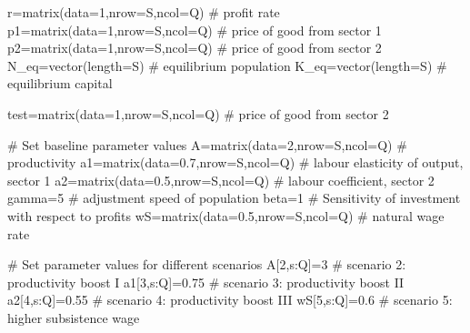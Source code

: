 \documentclass[
  letterpaper,
  DIV=11,
  numbers=noendperiod]{scrreprt}
\newenvironment{Shaded}{\begin{snugshade}}{\end{snugshade}}
\newcommand{\AttributeTok}[1]{\textcolor[rgb]{0.40,0.45,0.13}{#1}}
\newcommand{\CommentTok}[1]{\textcolor[rgb]{0.37,0.37,0.37}{#1}}
\newcommand{\DecValTok}[1]{\textcolor[rgb]{0.68,0.00,0.00}{#1}}
\newcommand{\FloatTok}[1]{\textcolor[rgb]{0.68,0.00,0.00}{#1}}
\newcommand{\FunctionTok}[1]{\textcolor[rgb]{0.28,0.35,0.67}{#1}}
\newcommand{\NormalTok}[1]{\textcolor[rgb]{0.00,0.23,0.31}{#1}}
\newcommand{\OtherTok}[1]{\textcolor[rgb]{0.00,0.23,0.31}{#1}}
\newcommand{\SpecialCharTok}[1]{\textcolor[rgb]{0.37,0.37,0.37}{#1}}
\begin{document}
\begin{Shaded}
\begin{Highlighting}[]
\NormalTok{r}\OtherTok{=}\FunctionTok{matrix}\NormalTok{(}\AttributeTok{data=}\DecValTok{1}\NormalTok{,}\AttributeTok{nrow=}\NormalTok{S,}\AttributeTok{ncol=}\NormalTok{Q) }\CommentTok{\# profit rate}
\NormalTok{p1}\OtherTok{=}\FunctionTok{matrix}\NormalTok{(}\AttributeTok{data=}\DecValTok{1}\NormalTok{,}\AttributeTok{nrow=}\NormalTok{S,}\AttributeTok{ncol=}\NormalTok{Q) }\CommentTok{\# price of good from sector 1}
\NormalTok{p2}\OtherTok{=}\FunctionTok{matrix}\NormalTok{(}\AttributeTok{data=}\DecValTok{1}\NormalTok{,}\AttributeTok{nrow=}\NormalTok{S,}\AttributeTok{ncol=}\NormalTok{Q) }\CommentTok{\# price of good from sector 2}
\NormalTok{N\_eq}\OtherTok{=}\FunctionTok{vector}\NormalTok{(}\AttributeTok{length=}\NormalTok{S)          }\CommentTok{\# equilibrium population}
\NormalTok{K\_eq}\OtherTok{=}\FunctionTok{vector}\NormalTok{(}\AttributeTok{length=}\NormalTok{S)          }\CommentTok{\# equilibrium capital}

\NormalTok{test}\OtherTok{=}\FunctionTok{matrix}\NormalTok{(}\AttributeTok{data=}\DecValTok{1}\NormalTok{,}\AttributeTok{nrow=}\NormalTok{S,}\AttributeTok{ncol=}\NormalTok{Q) }\CommentTok{\# price of good from sector 2}


\CommentTok{\# Set baseline parameter values}
\NormalTok{A}\OtherTok{=}\FunctionTok{matrix}\NormalTok{(}\AttributeTok{data=}\DecValTok{2}\NormalTok{,}\AttributeTok{nrow=}\NormalTok{S,}\AttributeTok{ncol=}\NormalTok{Q) }\CommentTok{\# productivity}
\NormalTok{a1}\OtherTok{=}\FunctionTok{matrix}\NormalTok{(}\AttributeTok{data=}\FloatTok{0.7}\NormalTok{,}\AttributeTok{nrow=}\NormalTok{S,}\AttributeTok{ncol=}\NormalTok{Q) }\CommentTok{\# labour elasticity of output, sector 1}
\NormalTok{a2}\OtherTok{=}\FunctionTok{matrix}\NormalTok{(}\AttributeTok{data=}\FloatTok{0.5}\NormalTok{,}\AttributeTok{nrow=}\NormalTok{S,}\AttributeTok{ncol=}\NormalTok{Q) }\CommentTok{\# labour coefficient, sector 2}
\NormalTok{gamma}\OtherTok{=}\DecValTok{5} \CommentTok{\# adjustment speed of population }
\NormalTok{beta}\OtherTok{=}\DecValTok{1} \CommentTok{\# Sensitivity of investment with respect to profits}
\NormalTok{wS}\OtherTok{=}\FunctionTok{matrix}\NormalTok{(}\AttributeTok{data=}\FloatTok{0.5}\NormalTok{,}\AttributeTok{nrow=}\NormalTok{S,}\AttributeTok{ncol=}\NormalTok{Q) }\CommentTok{\# natural wage rate}

\CommentTok{\# Set parameter values for different scenarios}
\NormalTok{A[}\DecValTok{2}\NormalTok{,s}\SpecialCharTok{:}\NormalTok{Q]}\OtherTok{=}\DecValTok{3}     \CommentTok{\# scenario 2: productivity boost I}
\NormalTok{a1[}\DecValTok{3}\NormalTok{,s}\SpecialCharTok{:}\NormalTok{Q]}\OtherTok{=}\FloatTok{0.75} \CommentTok{\# scenario 3: productivity boost II}
\NormalTok{a2[}\DecValTok{4}\NormalTok{,s}\SpecialCharTok{:}\NormalTok{Q]}\OtherTok{=}\FloatTok{0.55} \CommentTok{\# scenario 4: productivity boost III}
\NormalTok{wS[}\DecValTok{5}\NormalTok{,s}\SpecialCharTok{:}\NormalTok{Q]}\OtherTok{=}\FloatTok{0.6}  \CommentTok{\# scenario 5: higher subsistence wage}


\end{Highlighting}
\end{Shaded}
\end{document}
